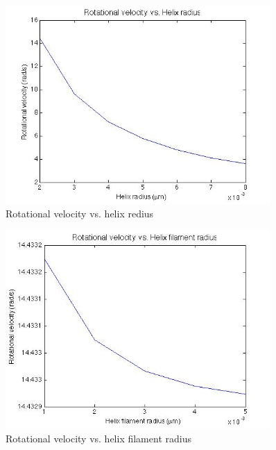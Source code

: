 \documentclass[12pt,a4paper,titlepage]{report}
\begin{document}
\begin{figure}
  \centering
    \includegraphics[width=0.90\textwidth]{RV_helixRadius1}
  \caption[Rotational velocity vs. helix rediu]{Rotational velocity vs. helix redius }
  \label{RV_helixRadius1}
\end{figure}



\begin{figure}
  \centering
    \includegraphics[width=0.90\textwidth]{RV_filamentRadius}
  \caption[Rotational velocity vs. helix filament radius]{Rotational velocity vs. helix filament radius }
  \label{RV_filamentRadius}
\end{figure}
\end{document}
